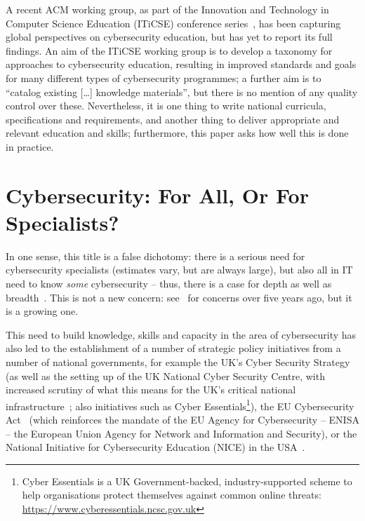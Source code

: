 \documentclass[conference]{IEEEtran}
\begin{document}
A recent ACM working group, as part of the Innovation and Technology in Computer Science Education (ITiCSE) conference series~\cite{Parrishetal2018a}, has been capturing global perspectives on cybersecurity education, but has yet to report its full findings. An aim of the ITiCSE working group is to develop a taxonomy for approaches to cybersecurity education, resulting in improved standards and goals for many different types of cybersecurity programmes; a further aim is to ``catalog existing [\dots] knowledge materials'', but there is no mention of any quality control over these. Nevertheless, it is one thing to write national curricula, specifications and requirements, and another thing to deliver appropriate and relevant education and skills; furthermore, this paper asks how well this is done in practice.

\section{Cybersecurity: For All, Or For Specialists?}

In one sense, this title is a false dichotomy: there is a serious need for cybersecurity specialists (estimates vary, but are always large), but also all in IT need to know \emph{some} cybersecurity -- thus, there is a case for depth as well as breadth~\cite{manson+pike:2014,davenport-et-al:latice2016}. This is not a new concern: see~\cite{Parr2014a} for concerns over five years ago, but it is a growing one.

This need to build knowledge, skills and capacity in the area of cybersecurity has also led to the establishment of a number of strategic policy initiatives from a number of national governments, for example the UK's Cyber Security Strategy~\cite{ukcyberstrategy:2016} (as well as the setting up of the UK National Cyber Security Centre, with increased scrutiny of what this means for the UK's critical national infrastructure~\cite{lordscyberreport:2018}; also initiatives such as Cyber Essentials\footnote{Cyber Essentials is a UK Government-backed, industry-supported scheme to help organisations protect themselves against common online threats: \url{https://www.cyberessentials.ncsc.gov.uk}}), the EU Cybersecurity Act~\cite{eucyber2018} (which reinforces the mandate of the EU Agency for Cybersecurity -- ENISA -- the European Union Agency for Network and Information and Security), or the National Initiative for Cybersecurity Education (NICE) in the USA~\cite{NICE}. 
\end{document}
